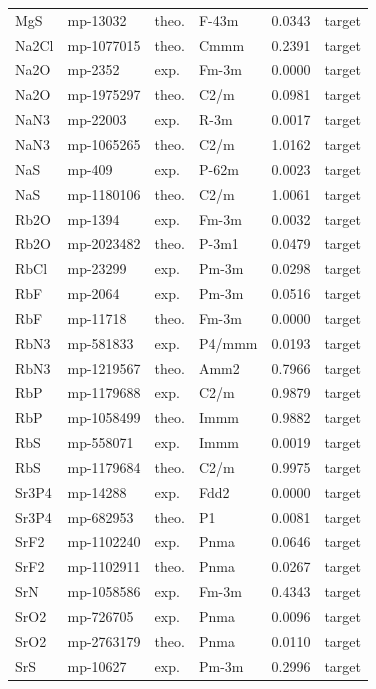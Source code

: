 \begin{longtable}{@{}lllllr@{}}
MgS & mp-13032 & theo. & F-43m & 0.0343 & target \\
Na2Cl & mp-1077015 & theo. & Cmmm & 0.2391 & target \\
Na2O & mp-2352 & exp. & Fm-3m & 0.0000 & target \\
Na2O & mp-1975297 & theo. & C2/m & 0.0981 & target \\
NaN3 & mp-22003 & exp. & R-3m & 0.0017 & target \\
NaN3 & mp-1065265 & theo. & C2/m & 1.0162 & target \\
NaS & mp-409 & exp. & P-62m & 0.0023 & target \\
NaS & mp-1180106 & theo. & C2/m & 1.0061 & target \\
Rb2O & mp-1394 & exp. & Fm-3m & 0.0032 & target \\
Rb2O & mp-2023482 & theo. & P-3m1 & 0.0479 & target \\
RbCl & mp-23299 & exp. & Pm-3m & 0.0298 & target \\
RbF & mp-2064 & exp. & Pm-3m & 0.0516 & target \\
RbF & mp-11718 & theo. & Fm-3m & 0.0000 & target \\
RbN3 & mp-581833 & exp. & P4/mmm & 0.0193 & target \\
RbN3 & mp-1219567 & theo. & Amm2 & 0.7966 & target \\
RbP & mp-1179688 & exp. & C2/m & 0.9879 & target \\
RbP & mp-1058499 & theo. & Immm & 0.9882 & target \\
RbS & mp-558071 & exp. & Immm & 0.0019 & target \\
RbS & mp-1179684 & theo. & C2/m & 0.9975 & target \\
Sr3P4 & mp-14288 & exp. & Fdd2 & 0.0000 & target \\
Sr3P4 & mp-682953 & theo. & P1 & 0.0081 & target \\
SrF2 & mp-1102240 & exp. & Pnma & 0.0646 & target \\
SrF2 & mp-1102911 & theo. & Pnma & 0.0267 & target \\
SrN & mp-1058586 & exp. & Fm-3m & 0.4343 & target \\
SrO2 & mp-726705 & exp. & Pnma & 0.0096 & target \\
SrO2 & mp-2763179 & theo. & Pnma & 0.0110 & target \\
SrS & mp-10627 & exp. & Pm-3m & 0.2996 & target \\
\end{longtable}
